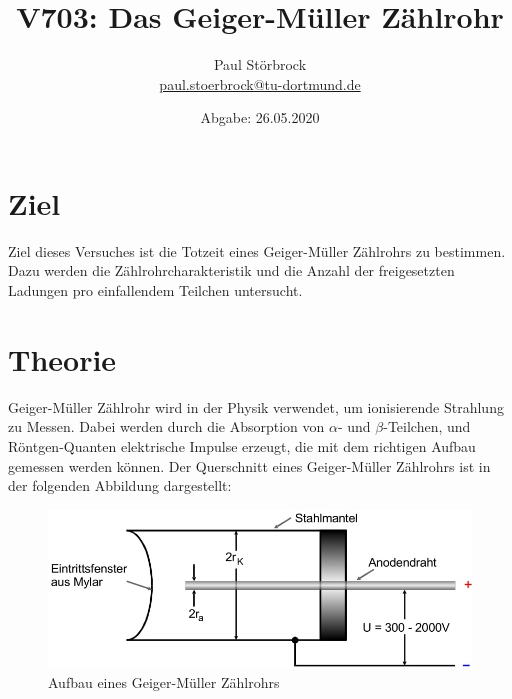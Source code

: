 
\usepackage{tikz}

\newcommand*\circled[1]{\tikz[baseline=(char.base)]{
            \node[shape=circle,draw,inner sep=2pt] (char) {#1};}}


    \title{V703: Das Geiger-Müller Zählrohr}
    \author{  
    Paul Störbrock\\
    \texorpdfstring{\href{mailto:paul.stoerbrock@tu-dortmund.de}{paul.stoerbrock@tu-dortmund.de}}{}
    }
    \date{Abgabe: 26.05.2020\vspace{-4ex}}
\maketitle
    
\newpage
\tableofcontents
\newpage

\setcounter{page}{1}

\section{Ziel}

    \justifying Ziel dieses Versuches ist die Totzeit eines Geiger-Müller Zählrohrs zu bestimmen. Dazu werden die 
    Zählrohrcharakteristik und die Anzahl der freigesetzten Ladungen pro einfallendem Teilchen untersucht. 

\section{Theorie}

    \justifying Geiger-Müller Zählrohr wird in der Physik verwendet, um
    ionisierende Strahlung zu Messen. Dabei werden durch die Absorption von $\alpha$- und
    $\beta$-Teilchen, und Röntgen-Quanten elektrische Impulse erzeugt, die mit dem 
    richtigen Aufbau gemessen werden können. Der Querschnitt eines Geiger-Müller Zählrohrs
    ist in der folgenden Abbildung dargestellt:

    \begin{figure}[H]
        \centering
        \includegraphics[width=\linewidth]{images/Querschnitt.jpg}
        \caption{Aufbau eines Geiger-Müller Zählrohrs \cite{V703}}
        \label{fig:1}
    \end{figure}

